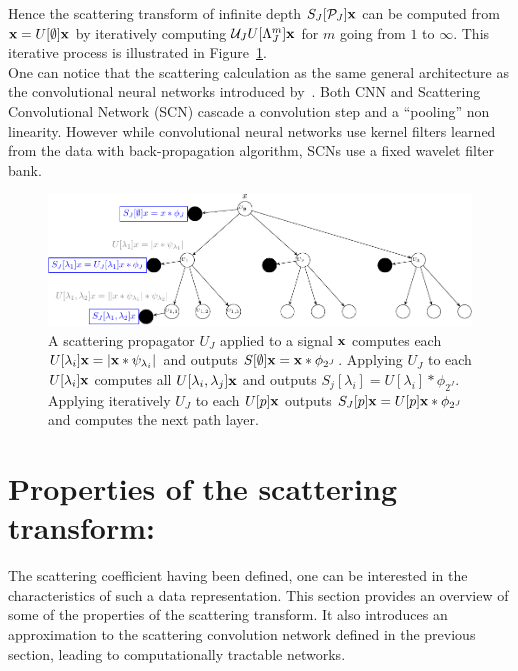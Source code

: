 \documentclass[a4paper,11pt]{report}
\begin{document}
			Hence the scattering transform of infinite depth $S_{J}[\mathcal{P}_{J}]{\bf x}$ can be computed from ${\bf x}= U[\emptyset]{\bf x}$ by iteratively computing $\mathcal{U}_{J}U[\Lambda_{J}^{m}] {\bf x}$ for $m$ going from $1$ to $\infty$. This iterative process is illustrated in Figure~\ref{fig:SCN}.\\
			
			One can notice that the scattering calculation as the same general architecture as the convolutional neural networks introduced by~\citet{lecun1995convolutional}. Both CNN and Scattering Convolutional Network (SCN) cascade a convolution step and a ``pooling'' non linearity. However while convolutional neural networks use kernel filters learned from the data with back-propagation algorithm, SCNs use a fixed wavelet filter bank. 

      \begin{figure}[h]
				\begin{center}
					\includegraphics[width=5in]{ST_crop.pdf}
					\caption[Scattering convolutional network architecture.]{\centering A scattering propagator $U_{J}$ applied to a signal ${\bf x}$ computes each $U[\lambda_{i}]{\bf x} = |{\bf x} \ast \psi_{\lambda_{i}}|$ and outputs $S[\emptyset]{\bf x}= {\bf x} \ast \phi_{2^{J}}$. Applying $U_{J}$ to each  $U[\lambda_{i}]{\bf x}$ computes all $U[\lambda_{i},\lambda_{j}]{\bf x}$ and outputs $S_{j}[\lambda_{i}] =  U[\lambda_{i}] \ast \phi_{2^{J}}$. Applying iteratively $U_{J}$ to each $U[p]{\bf x}$ outputs $S_{J}[p]{\bf x} = U[p]{\bf x} \ast \phi_{2^{J}}$ and computes the next path layer.}
					\label{fig:SCN}
				\end{center}	
      \end{figure}
      
      
      
	\section{Properties of the scattering transform:}
		\label{sec:ST/Pties}
		
		The scattering coefficient having been defined, one can be interested in the characteristics of such a data representation. This section provides an overview of some of the properties of the scattering transform. It also introduces an approximation to the scattering convolution network defined in the previous section, leading to computationally tractable networks.\\
		
\end{document}
